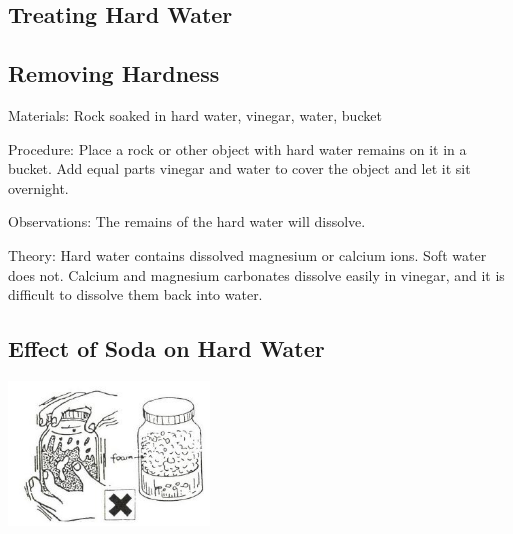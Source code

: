 \begin{multicols}{2}
\vfill
\columnbreak


\section*{Treating Hard Water} 


\subsection{Removing Hardness}


\begin{description*}
\item[Materials:]{Rock soaked in hard water, vinegar, water, bucket}
\item[Procedure:]{Place a rock or other object with hard water remains on it in a bucket. Add equal parts vinegar and water to cover the object and let it sit overnight.}
\item[Observations:]{The remains of the hard water will dissolve.}
\item[Theory:]{Hard water contains dissolved magnesium or calcium ions.
Soft water does not. Calcium and magnesium carbonates dissolve easily in vinegar, and it is difficult to dissolve them back into water.}
\end{description*}

\vfill
\columnbreak

\subsection{Effect of Soda on Hard Water}

\begin{center}
\includegraphics[width=0.4\textwidth]{./img/source/soda-hard-water.jpg}
\end{center}


\end{multicols}
